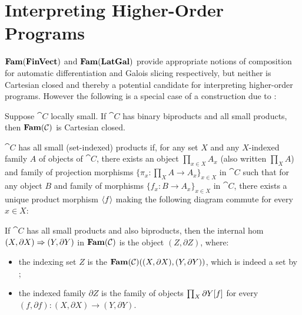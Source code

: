 \section{Interpreting Higher-Order Programs}
\label{sec:higher-order}

$\mathbf{Fam}(\mathbf{FinVect})$ and $\mathbf{Fam}(\mathbf{LatGal})$ provide appropriate notions of composition for automatic differentiation
and Galois slicing respectively, but neither is Cartesian closed and thereby a potential candidate for
interpreting higher-order programs. However the following is a special case of a construction due to
\citet{nunes2023}:

\begin{proposition}
Suppose $\cat{C}$ locally small. If $\cat{C}$ has binary biproducts and all small products, then
$\mathbf{Fam}(\mathcal{C})$ is Cartesian closed.
\end{proposition}

$\cat{C}$ has all small (set-indexed) products if, for any set $X$ and any $X$-indexed family $A$ of objects
of $\cat{C}$, there exists an object $\prod_{x \in X}A_x$ (also written $\prod_{X} A$) and family of
projection morphisms $\{\pi_x: \prod_{X} A \to A_x\}_{x \in X}$ in $\cat{C}$ such that for any object $B$
and family of morphisms $\{f_x: B \to A_x\}_{x \in X}$ in $\cat{C}$, there exists a unique product morphism
$\langle f\rangle$ making the following diagram commute for every $x \in X$:

\begin{center}
\end{center}

If $\cat{C}$ has all small products and also biproducts, then the internal hom $(X, \partial
X) \Rightarrow (Y, \partial Y)$ in $\mathbf{Fam}(\mathcal{C})$ is the object $(Z, \partial Z)$, where:
\begin{itemize}
\item the indexing set $Z$ is the $\mathbf{Fam}(\mathcal{C})((X, \partial X), (Y, \partial Y))$, which is indeed a set by
;
\item the indexed family $\partial Z$ is the family of objects $\prod_{X}\partial Y[f]$ for every
${(f, \partial f): (X, \partial X) \to (Y, \partial Y)}$.
\end{itemize}

